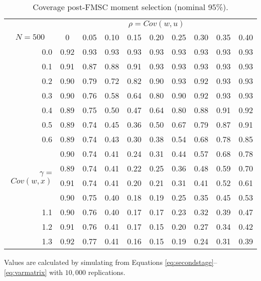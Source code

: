 %
\begin{table}[!tbp]
 \begin{center}
 \caption{Coverage post-FMSC moment selection (nominal 95\%).}
\label{tab:FMSCconf}
\small
 \begin{tabular}{r|rrrrrrrrr}\hline\hline
&\multicolumn{9}{c}{$\rho = Cov(w,u)$}\\
\multicolumn{1}{c|}{$N=500$}&\multicolumn{1}{c}{0}&\multicolumn{1}{c}{0.05}&\multicolumn{1}{c}{0.10}&\multicolumn{1}{c}{0.15}&\multicolumn{1}{c}{0.20}&\multicolumn{1}{c}{0.25}&\multicolumn{1}{c}{0.30}&\multicolumn{1}{c}{0.35}&\multicolumn{1}{c}{0.40}\tabularnewline
\hline
0.0&0.92&0.93&0.93&0.93&0.93&0.93&0.93&0.93&0.93\tabularnewline
0.1&0.91&0.87&0.88&0.91&0.93&0.93&0.93&0.93&0.93\tabularnewline
0.2&0.90&0.79&0.72&0.82&0.90&0.93&0.92&0.93&0.93\tabularnewline
0.3&0.90&0.76&0.58&0.64&0.80&0.90&0.92&0.93&0.93\tabularnewline
0.4&0.89&0.75&0.50&0.47&0.64&0.80&0.88&0.91&0.92\tabularnewline
0.5&0.89&0.74&0.45&0.36&0.50&0.67&0.79&0.87&0.91\tabularnewline
0.6&0.89&0.74&0.43&0.30&0.38&0.54&0.68&0.78&0.85\tabularnewline
\multirow{4}{5mm}{\begin{sideways}\parbox{1mm}{$\gamma\;$=$\;Cov(w,x)$}\end{sideways}}
0.7&0.90&0.74&0.41&0.24&0.31&0.44&0.57&0.68&0.78\tabularnewline
0.8&0.89&0.74&0.41&0.22&0.25&0.36&0.48&0.59&0.70\tabularnewline
0.9&0.91&0.74&0.41&0.20&0.21&0.31&0.41&0.52&0.61\tabularnewline
1.0&0.90&0.75&0.40&0.18&0.19&0.25&0.35&0.45&0.53\tabularnewline
1.1&0.90&0.76&0.40&0.17&0.17&0.23&0.32&0.39&0.47\tabularnewline
1.2&0.91&0.76&0.41&0.17&0.15&0.20&0.27&0.34&0.42\tabularnewline
1.3&0.92&0.77&0.41&0.16&0.15&0.19&0.24&0.31&0.39\tabularnewline
\hline
\end{tabular}
\end{center}
\footnotesize
\begin{tablenotes}
\item Values are calculated by simulating from Equations \ref{eq:secondstage}--\ref{eq:varmatrix} with $10,000$ replications.
\end{tablenotes}
\end{table}



